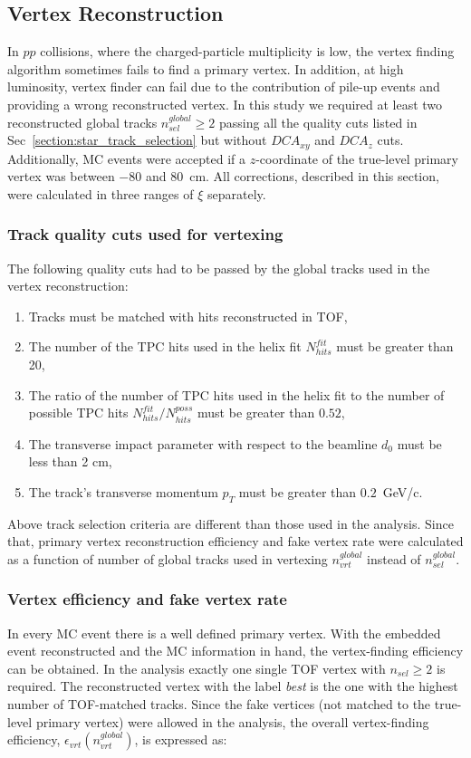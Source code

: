 \subsection{Vertex Reconstruction}\label{section:star_vertex}

In $pp$ collisions, where the charged-particle multiplicity is low, the vertex finding algorithm sometimes fails to find a primary vertex. In addition, at high luminosity, vertex finder can fail due to the contribution of pile-up events and providing a wrong reconstructed vertex. In this study we required at least two reconstructed global tracks $n^{global}_{sel}\geq 2$ passing all the quality cuts listed in Sec~\ref{section:star_track_selection} but without $DCA_{xy}$ and $DCA_{z}$ cuts.  Additionally, MC events were accepted if a $z$-coordinate of the true-level primary vertex was between $-80$ and $80$~cm. All corrections, described in this section, were calculated in three ranges of $\xi$ separately.

\subsubsection{Track quality cuts used for vertexing}
The following quality cuts had to be passed by the global tracks used in the vertex reconstruction:
\begin{enumerate}
	\item Tracks must be matched with hits reconstructed in TOF,
	\item The number of the TPC hits used in the helix fit $N_{hits}^{fit}$ must be greater than 20,
	\item The ratio of the number of TPC hits used in the helix fit to the number of possible TPC hits $N_{hits}^{fit}/N_{hits}^{poss}$ must be greater than $0.52$,
	\item The transverse impact parameter with respect to the beamline $d_0$ must be less than 2 cm,
	\item The track's transverse momentum $p_T$ must be greater than $0.2$~GeV/c.
\end{enumerate}
 Above track selection criteria are different than those used in the analysis. Since that, primary vertex reconstruction efficiency and fake vertex rate were calculated as a function of number of global tracks used in vertexing $n^{global}_{vrt}$ instead of $n^{global}_{sel}$. 

\subsubsection{Vertex efficiency and fake vertex rate}
In every MC event there is a well defined primary vertex.  With the embedded event reconstructed and the MC information in hand,
the vertex-finding efficiency can be obtained. In the analysis exactly one single TOF vertex with $n_{sel}\geq 2$ is required.  The reconstructed vertex with the label \textit{best} is the one with the highest number of TOF-matched tracks. Since the fake vertices (not matched to the true-level primary vertex) were allowed in the analysis, the overall vertex-finding efficiency, $\epsilon_{vrt}\left(n_{vrt}^{global}\right)$, is expressed as:

